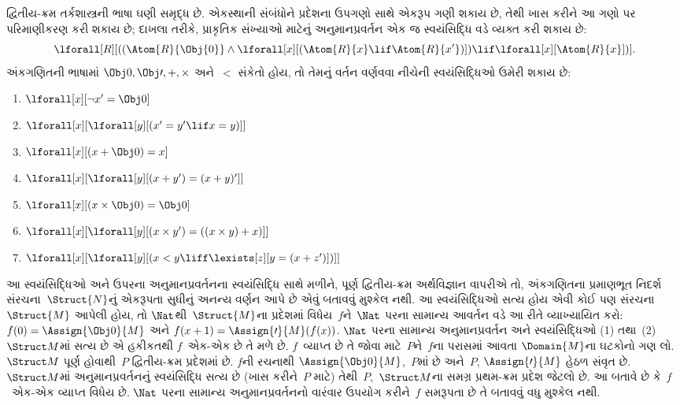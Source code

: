 દ્વિતીય-ક્રમ તર્કશાસ્ત્રની ભાષા ઘણી સમૃદ્ધ છે. એકસ્થાની સંબંધોને
પ્રદેશના ઉપગણો સાથે એકરૂપ ગણી શકાય છે, તેથી ખાસ કરીને આ ગણો પર
પરિમાણીકરણ કરી શકાય છે; દાખલા તરીકે, પ્રાકૃતિક સંખ્યાઓ માટેનું
અનુમાનપ્રવર્તન એક જ સ્વયંસિદ્ધિ વડે વ્યક્ત કરી શકાય છે:
\[
\lforall[R][((\Atom{R}{\Obj{0}} \land \lforall[x][(\Atom{R}{x} \lif
    \Atom{R}{x'})]) \lif \lforall[x][\Atom{R}{x}])].
\]
અંકગણિતની ભાષામાં $\Obj 0, \Obj \prime, +, \times$ અને~$<$ સંકેતો
હોય, તો તેમનું વર્તન વર્ણવવા નીચેની સ્વયંસિદ્ધિઓ ઉમેરી શકાય છે:
\begin{enumerate}
\item $\lforall[x][\lnot x' = \Obj 0]$
\item $\lforall[x][\lforall[y][(x' = y' \lif x = y)]]$
\item $\lforall[x][(x + \Obj 0) = x]$
\item $\lforall[x][\lforall[y][(x + y') = (x + y)']]$
\item $\lforall[x][(x \times \Obj 0) = \Obj 0]$
\item $\lforall[x][\lforall[y][(x \times y') = ((x \times y) + x)]]$
\item $\lforall[x][\lforall[y][(x < y \liff \lexists[z][y = (x + z')])]]$
\end{enumerate}
આ સ્વયંસિદ્ધિઓ અને ઉપરના અનુમાનપ્રવર્તનના સ્વયંસિદ્ધિ સાથે મળીને, પૂર્ણ
દ્વિતીય-ક્રમ અર્થવિજ્ઞાન વાપરીએ તો, અંકગણિતના પ્રમાણભૂત નિદર્શ
સંરચના~$\Struct{N}$નું એકરૂપતા સુધીનું અનન્ય વર્ણન આપે છે એવું
બતાવવું મુશ્કેલ નથી. આ સ્વયંસિદ્ધિઓ સત્ય હોય એવી કોઈ પણ
સંરચના~$\Struct{M}$ આપેલી હોય, તો $\Nat$થી~$\Struct{M}$ના
પ્રદેશમાં વિધેય~$f$ને~$\Nat$ પરના સામાન્ય આવર્તન વડે આ રીતે
વ્યાખ્યાયિત કરો: $f(0) = \Assign{\Obj 0}{M}$ અને
$f(x+1) = \Assign{\prime}{M}(f(x))$. $\Nat$ પરના સામાન્ય
અનુમાનપ્રવર્તન અને સ્વયંસિદ્ધિઓ (1) તથા~(2)~$\Struct M$માં સત્ય છે એ
હકીકતથી $f$~એક-એક છે તે મળે છે. $f$~વ્યાપ્ત છે તે
જોવા માટે~$P$ને~$f$ના પરાસમાં આવતા $\Domain{M}$ના ઘટકોનો ગણ
લો. $\Struct M$ પૂર્ણ હોવાથી~$P$ દ્વિતીય-ક્રમ પ્રદેશમાં છે.
$f$ની રચનાથી $\Assign{\Obj 0}{M}$,~$P$માં છે અને~$P$,
$\Assign{\prime}{M}$ હેઠળ સંવૃત છે. $\Struct M$માં અનુમાનપ્રવર્તનનું
સ્વયંસિદ્ધિ સત્ય છે (ખાસ કરીને~$P$ માટે) તેથી~$P$,~$\Struct M$ના
સમગ્ર પ્રથમ-ક્રમ પ્રદેશ જેટલો છે. આ બતાવે છે કે~$f$~એક-એક વ્યાપ્ત વિધેય
છે. $\Nat$ પરના સામાન્ય અનુમાનપ્રવર્તનનો વારંવાર ઉપયોગ કરીને~$f$
સમરૂપતા છે તે બતાવવું વધુ મુશ્કેલ નથી.

